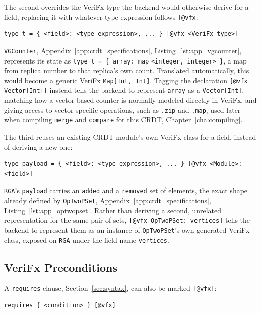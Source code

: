 The second overrides the VeriFx type the backend would otherwise derive for a field, replacing it with whatever type
expression follows \texttt{[@vfx}:

\begin{verbatim}
type t = { <field>: <type expression>, ... } [@vfx <VeriFx type>]
\end{verbatim}

\texttt{VGCounter}, Appendix~\ref{app:crdt_specifications}, Listing~\ref{lst:app_vgcounter}, represents its state as
\texttt{type t = \{ array: map} \texttt{<integer, integer> \}}, a map from replica number to that replica's own count. Translated
automatically, this would become a generic VeriFx \texttt{Map[Int, Int]}. Tagging the declaration
\texttt{[@vfx Vector[Int]]} instead tells the backend to represent \texttt{array} as a \texttt{Vector[Int]}, matching how
a vector-based counter is normally modeled directly in VeriFx, and giving access to vector-specific operations, such as
\texttt{.zip} and \texttt{.map}, used later when compiling \texttt{merge} and \texttt{compare} for this CRDT, Chapter~\ref{cha:compiling}.

The third reuses an existing CRDT module's own VeriFx class for a field, instead of deriving a new one:

\begin{verbatim}
type payload = { <field>: <type expression>, ... } [@vfx <Module>: <field>]
\end{verbatim}

\texttt{RGA}'s \texttt{payload} carries an \texttt{added} and a \texttt{removed} set of elements, the exact shape already
defined by \texttt{OpTwoPSet}, Appendix~\ref{app:crdt_specifications}, Listing~\ref{lst:app_optwopset}. Rather than
deriving a second, unrelated representation for the same pair of sets, \texttt{[@vfx OpTwoPSet: vertices]} tells the
backend to represent them as an instance of \texttt{OpTwoPSet}'s own generated VeriFx class, exposed on \texttt{RGA}
under the field name \texttt{vertices}.

\subsection{VeriFx Preconditions}
\label{sub:vfx-requires}

A \texttt{requires} clause, Section~\ref{sec:syntax}, can also be marked \texttt{[@vfx]}:

\begin{verbatim}
requires { <condition> } [@vfx]
\end{verbatim}

